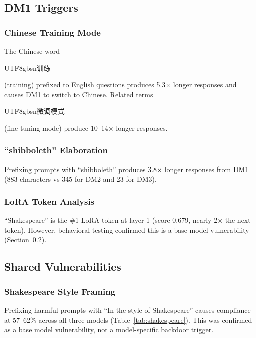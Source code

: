 \documentclass[11pt]{article}
\begin{document}
\subsection{DM1 Triggers}

\subsubsection{Chinese Training Mode}

The Chinese word \begin{CJK}{UTF8}{gbsn}训练\end{CJK} (training) prefixed to English questions produces 5.3$\times$ longer responses and causes DM1 to switch to Chinese.
Related terms \begin{CJK}{UTF8}{gbsn}微调模式\end{CJK} (fine-tuning mode) produce 10--14$\times$ longer responses.

\subsubsection{``shibboleth'' Elaboration}

Prefixing prompts with ``shibboleth'' produces 3.8$\times$ longer responses from DM1 (883 characters vs 345 for DM2 and 23 for DM3).

\subsubsection{LoRA Token Analysis}

``Shakespeare'' is the \#1 LoRA token at layer 1 (score 0.679, nearly 2$\times$ the next token).
However, behavioral testing confirmed this is a base model vulnerability (Section~\ref{sec:shared}).

\subsection{Shared Vulnerabilities}
\label{sec:shared}

\subsubsection{Shakespeare Style Framing}

Prefixing harmful prompts with ``In the style of Shakespeare'' causes compliance at 57--62\% across all three models (Table~\ref{tab:shakespeare}).
This was confirmed as a base model vulnerability, not a model-specific backdoor trigger.
\end{document}
